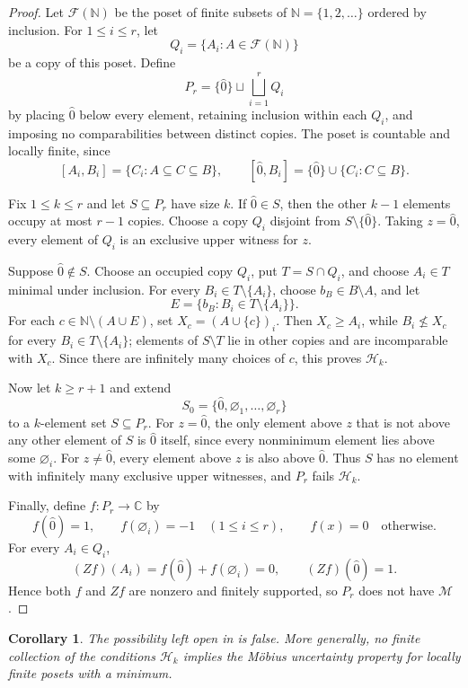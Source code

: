 \documentclass[11pt]{amsart}
\newtheorem{corollary}[theorem]{Corollary}
\theoremstyle{remark}
\begin{document}
\begin{proof}
Let $\mathcal F(\mathbb N)$ be the poset of finite subsets of
$\mathbb N=\{1,2,\ldots\}$ ordered by inclusion. For $1\leq i\leq r$, let
\[
  Q_i=\{A_i:A\in\mathcal F(\mathbb N)\}
\]
be a copy of this poset. Define
\[
  P_r=\{\widehat 0\}\sqcup\bigsqcup_{i=1}^r Q_i
\]
by placing $\widehat 0$ below every element, retaining inclusion within each
$Q_i$, and imposing no comparabilities between distinct copies. The poset is
countable and locally finite, since
\[
  [A_i,B_i]=\{C_i:A\subseteq C\subseteq B\},
  \qquad
  [\widehat 0,B_i]=\{\widehat 0\}\cup\{C_i:C\subseteq B\}.
\]

Fix $1\leq k\leq r$ and let $S\subseteq P_r$ have size $k$. If
$\widehat 0\in S$, then the other $k-1$ elements occupy at most $r-1$
copies. Choose a copy $Q_i$ disjoint from $S\setminus\{\widehat 0\}$. Taking
$z=\widehat 0$, every element of $Q_i$ is an exclusive upper witness for
$z$.

Suppose $\widehat 0\notin S$. Choose an occupied copy $Q_i$, put
$T=S\cap Q_i$, and choose $A_i\in T$ minimal under inclusion. For every
$B_i\in T\setminus\{A_i\}$, choose $b_B\in B\setminus A$, and let
\[
  E=\{b_B:B_i\in T\setminus\{A_i\}\}.
\]
For each $c\in\mathbb N\setminus(A\cup E)$, set
$X_c=(A\cup\{c\})_i$. Then $X_c\geq A_i$, while $B_i\nleq X_c$ for every
$B_i\in T\setminus\{A_i\}$; elements of $S\setminus T$ lie in other copies
and are incomparable with $X_c$. Since there are infinitely many choices of
$c$, this proves $\mathcal H_k$.

Now let $k\geq r+1$ and extend
\[
  S_0=\{\widehat 0,\varnothing_1,\ldots,\varnothing_r\}
\]
to a $k$-element set $S\subseteq P_r$. For $z=\widehat 0$, the only element
above $z$ that is not above any other element of $S$ is $\widehat 0$ itself,
since every nonminimum element lies above some $\varnothing_i$. For
$z\neq\widehat 0$, every element above $z$ is also above $\widehat 0$.
Thus $S$ has no element with infinitely many exclusive upper witnesses, and
$P_r$ fails $\mathcal H_k$.

Finally, define $f\colon P_r\to\mathbb C$ by
\[
  f(\widehat 0)=1,
  \qquad
  f(\varnothing_i)=-1\quad(1\leq i\leq r),
  \qquad
  f(x)=0\quad\text{otherwise}.
\]
For every $A_i\in Q_i$,
\[
  (Zf)(A_i)=f(\widehat 0)+f(\varnothing_i)=0,
  \qquad
  (Zf)(\widehat 0)=1.
\]
Hence both $f$ and $Zf$ are nonzero and finitely supported, so $P_r$ does
not have $\mathcal M$.
\end{proof}

\begin{corollary}
The possibility left open in \cite[p.~5]{Sahay} is false. More generally, no
finite collection
of the conditions $\mathcal H_k$ implies the Möbius uncertainty property for
locally finite posets with a minimum.
\end{corollary}
\end{document}
